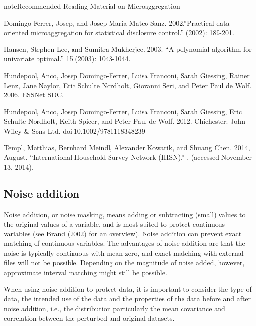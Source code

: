 \documentclass[letterpaper,10pt,english]{sphinxmanual}
\begin{document}
\begin{sphinxadmonition}{note}{Recommended Reading Material on Microaggregation}

Domingo-Ferrer, Josep, and Josep Maria Mateo-Sanz. 2002.”Practical
data-oriented microaggregation for statistical disclosure control.”
 (2002):
189-201.

Hansen, Stephen Lee, and Sumitra Mukherjee. 2003. “A polynomial
algorithm for univariate optimal.”  15 (2003): 1043-1044.

Hundepool, Anco, Josep Domingo-Ferrer, Luisa Franconi, Sarah Giessing,
Rainer Lenz, Jane Naylor, Eric Schulte Nordholt, Giovanni Seri, and
Peter Paul de Wolf. 2006. 
ESSNet SDC. 

Hundepool, Anco, Josep Domingo-Ferrer, Luisa Franconi, Sarah Giessing,
Eric Schulte Nordholt, Keith Spicer, and Peter Paul de Wolf. 2012.
 Chichester: John Wiley \& Sons Ltd.
doi:10.1002/9781118348239.

Templ, Matthias, Bernhard Meindl, Alexander Kowarik, and Shuang Chen.
2014, August. “International Household Survey Network (IHSN).”
. (accessed
November 13, 2014).
\end{sphinxadmonition}


\subsection{Noise addition}
\label{\detokenize{anon_methods:noise-addition}}
Noise addition, or noise masking, means adding or subtracting (small)
values to the original values of a variable, and is most suited to
protect continuous variables (see Brand (2002) for an overview). Noise
addition can prevent exact matching of continuous variables. The
advantages of noise addition are that the noise is typically continuous
with mean zero, and exact matching with external files will not be
possible. Depending on the magnitude of noise added, however,
approximate interval matching might still be possible.

When using noise addition to protect data, it is important to consider
the type of data, the intended use of the data and the properties of the
data before and after noise addition, i.e., the distribution \textendash{}
particularly the mean \textendash{} covariance and correlation between the perturbed
and original datasets.
\end{document}
